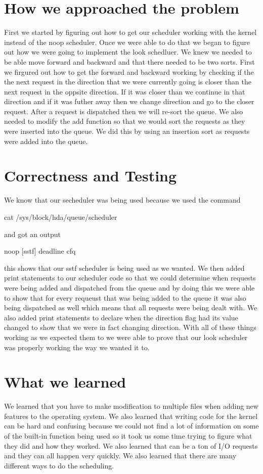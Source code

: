 \documentclass[letterpaper,10pt,titlepage]{article}
\begin{document}
\section{How we approached the problem}
First we started by figuring out how to get our scheduler working with the kernel 
instead of the noop scheduler. Once we were able to do that we began to figure 
out how we were going to implement the look schedluer. We knew we needed to be 
able move forward and backward and that there needed to be two sorts. First we 
firgured out how to get the forward and backward working by checking if the the 
next request in the direction that we were currently going is closer than the 
next request in the oppsite direction. If it was closer than we continue in that 
direction and if it was futher away then we change direction and go to the closer 
request. After a request is dispatched then we will re-sort the queue. We also 
needed to modify the add function so that we would sort the requests as they were 
inserted into the queue. We did this by using an insertion sort as requests were 
added into the queue.

\section{Correctness and Testing}
We know that our secheduler was being used because we used the command

cat /sys/block/hda/queue/scheduler

and got an output

noop [sstf] deadline cfq

this shows that our sstf scheduler is being used as we wanted. We then 
added print statements to our scheduler code so that we could determine 
when requests were being added and dispatched from the queue and by doing 
this we were able to show that for every requeust that was being added to 
the queue it was also being dispatched as well which means that all requests 
were being dealt with. We also added print statements to declare when the direction flag had its value changed to show that we were in fact changing direction. With all of these things 
working as we expected them to we were able to prove that our look 
scheduler was properly working the way we wanted it to. 

\section{What we learned}
We learned that you have to make modification to multiple files when adding 
new features to the operating system. We also learned that writing code for 
the kernel can be hard and confusing because we could not find a lot of 
information on some of the built-in function being used so it took us some 
time trying to figure what they did and how they worked. We also learned that 
can be a ton of I/O requests and they can all happen very quickly. We also 
learned that there are many different ways to do the scheduling. 
\end{document}
